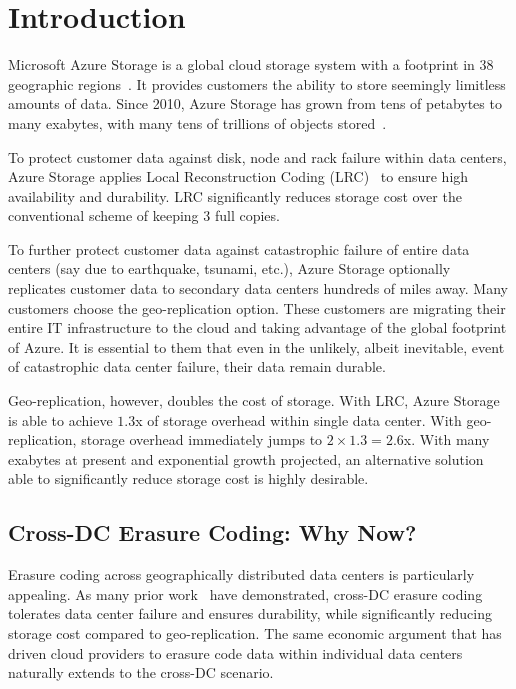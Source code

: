 \section{Introduction}

Microsoft Azure Storage is a global cloud storage system with a footprint in 38 geographic regions~\cite{}. It provides customers the ability to store seemingly limitless amounts of data. Since 2010, Azure Storage has grown from tens of petabytes to many exabytes, with many tens of trillions of objects stored~\cite{}.


To protect customer data against disk, node and rack failure within data centers, Azure Storage applies Local Reconstruction Coding (LRC)~\cite{} to ensure high availability and durability. LRC significantly reduces storage cost over the conventional scheme of keeping 3 full copies.

To further protect customer data against catastrophic failure of entire data centers (say due to earthquake, tsunami, etc.), Azure Storage optionally replicates customer data to secondary data centers hundreds of miles away. Many customers choose the geo-replication option. These customers are migrating their entire IT infrastructure to the cloud and taking advantage of the global footprint of Azure. It is essential to them that even in the unlikely, albeit inevitable, event of catastrophic data center failure, their data remain durable.

Geo-replication, however, doubles the cost of storage. With LRC, Azure Storage is able to achieve $1.3$x of storage overhead within single data center. With geo-replication, storage overhead immediately jumps to $2 \times 1.3 = 2.6$x. With many exabytes at present and exponential growth projected, an alternative solution able to significantly reduce storage cost is highly desirable.

\subsection{Cross-DC Erasure Coding: Why Now?}

Erasure coding across geographically distributed data centers is particularly appealing. As many prior work~\cite{oceanstore:asplos00, pond:fast03, weatherspoon2005long, hail:ccs09, racs:socc10, hu12nccloud} have demonstrated, cross-DC erasure coding tolerates data center failure and ensures durability, while significantly reducing storage cost compared to geo-replication. The same economic argument that has driven cloud providers to erasure code data within individual data centers naturally extends to the cross-DC scenario.

